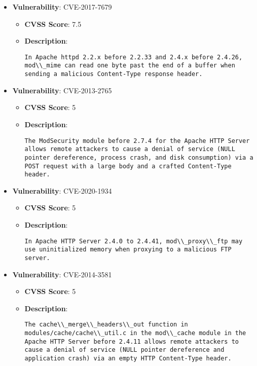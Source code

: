 \documentclass{article}
\begin{document}
\begin{itemize}
        \item \textbf{Vulnerability}: CVE-2017-7679
        \begin{itemize}
            \item \textbf{CVSS Score}:  7.5 
            \item \textbf{Description}:
            \parbox[t]{0.9\linewidth}{
                \verb|In Apache httpd 2.2.x before 2.2.33 and 2.4.x before 2.4.26, mod\\_mime can read one byte past the end of a buffer when sending a malicious Content-Type response header.|
            }
        \end{itemize}
    
        \item \textbf{Vulnerability}: CVE-2013-2765
        \begin{itemize}
            \item \textbf{CVSS Score}:  5 
            \item \textbf{Description}:
            \parbox[t]{0.9\linewidth}{
                \verb|The ModSecurity module before 2.7.4 for the Apache HTTP Server allows remote attackers to cause a denial of service (NULL pointer dereference, process crash, and disk consumption) via a POST request with a large body and a crafted Content-Type header.|
            }
        \end{itemize}
    
        \item \textbf{Vulnerability}: CVE-2020-1934
        \begin{itemize}
            \item \textbf{CVSS Score}:  5 
            \item \textbf{Description}:
            \parbox[t]{0.9\linewidth}{
                \verb|In Apache HTTP Server 2.4.0 to 2.4.41, mod\\_proxy\\_ftp may use uninitialized memory when proxying to a malicious FTP server.|
            }
        \end{itemize}
    
        \item \textbf{Vulnerability}: CVE-2014-3581
        \begin{itemize}
            \item \textbf{CVSS Score}:  5 
            \item \textbf{Description}:
            \parbox[t]{0.9\linewidth}{
                \verb|The cache\\_merge\\_headers\\_out function in modules/cache/cache\\_util.c in the mod\\_cache module in the Apache HTTP Server before 2.4.11 allows remote attackers to cause a denial of service (NULL pointer dereference and application crash) via an empty HTTP Content-Type header.|
            }
        \end{itemize}
    

\end{itemize}
\end{document}

